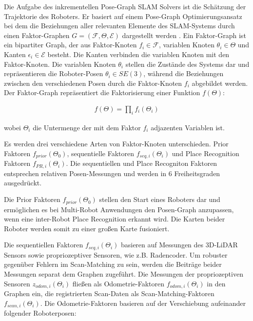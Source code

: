 Die Aufgabe des inkrementellen Pose-Graph SLAM Solvers ist die Schätzung der Trajektorie des Roboters. Er basiert auf einem Pose-Graph Optimierungsansatz bei dem die Beziehungen aller relevanten Elemente des SLAM-Systems durch einen Faktor-Graphen $ G = (\mathcal{F},\Theta,\mathcal{E}) $ dargestellt werden \cite{Dube2017b}. Ein Faktor-Graph ist ein bipartiter Graph, der aus Faktor-Knoten $ f_i\in \mathcal{F} $, variablen Knoten $ \theta_i\in \Theta $ und Kanten $ \epsilon_i\in \mathcal{E} $ besteht. Die Kanten verbinden die variablen Knoten mit den Faktor-Knoten. Die variablen Knoten $ \theta_i $ stellen die Zustände des Systems dar und repräsentieren die Roboter-Posen $\theta_i\in SE(3) $, während die Beziehungen zwischen den verschiedenen Posen durch die Faktor-Knoten $ f_i $ abgebildet werden. Der Faktor-Graph repräsentiert die Faktorisierung einer Funktion $ f(\Theta) $:

\begin{align}
	f(\Theta) = \prod_if_i(\Theta_i)
\end{align}

wobei $ \Theta_i $ die Untermenge der mit dem Faktor $ f_i $ adjazenten %
Variablen ist.

Es werden drei verschiedene Arten von Faktor-Knoten unterschieden. Prior Faktoren $ f_{prior}(\Theta_0) $, sequentielle Faktoren $ f_{seq,i}(\Theta_i) $ und Place Recognition Faktoren $ f_{PR,i}(\Theta_i) $. Die sequentiellen und Place Recogniton Faktoren entsprechen relativen Po\-sen-Mes\-sung\-en und werden in 6 Freiheitsgraden ausgedrückt. 

Die Prior Faktoren $ f_{prior}(\Theta_0) $ stellen den Start eines Roboters dar und ermöglichen es bei Multi-Robot Anwendungen den Posen-Graph anzupassen, wenn eine inter-Robot Place Recognition erkannt wird. Die Karten beider Roboter werden somit zu einer großen Karte fusioniert.  
 
Die sequentiellen Faktoren $ f_{seq,i}(\Theta_i) $ basieren auf Messungen des 3D-LiDAR Sensors sowie propriozeptiver Sensoren, wie z.B. Radencoder. Um robuster gegenüber Fehlern im Scan-Matching zu sein, werden die Beiträge beider Messungen separat dem Graphen zugeführt. Die Messungen der propriozeptiven Sensoren $ z_{odom,i}(\Theta_i) $ fließen als Odometrie-Faktoren $ f_{odom,i}(\Theta_i) $ in den Graphen ein, die registrierten Scan-Daten als Scan-Matching-Faktoren $ f_{scan,i}(\Theta_i) $. Die Odometrie-Faktoren basieren auf der Verschiebung aufeinander folgender Roboterposen:

